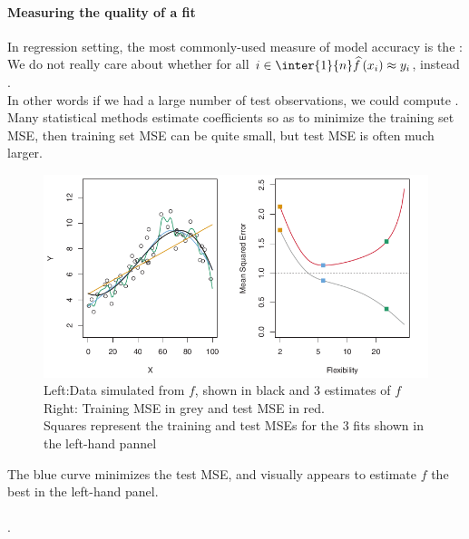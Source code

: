 \paragraph{Measuring the quality of a fit}
In regression setting, the most commonly-used measure of model accuracy
is the :
\\We do not really care about whether for all $i\in\inter{1}{n}
\widehat{f}\left( x_{i} \right)\approx y_{i}$, instead .\\In other words if we
had a large number of test observations, we could compute 
.\\Many 
statistical methods estimate coefficients so as to minimize the 
training set MSE, then training set MSE can be quite small, but test
MSE is often much larger.
\begin{figure}[H]
  \centering
  \includegraphics[width=\textwidth]{./chap/1chap/1sec/2images/2_1trainingMSEandTestMSE.png}
  \caption{Left:Data simulated from $f$, shown in black and 3 estimates
  of $f$\\Right: Training MSE in grey and test MSE in red.\\Squares
represent the training and test MSEs for the 3 fits shown in the 
left-hand pannel}
  \label{fig:2.1}
\end{figure}
The blue curve minimizes the test MSE, and visually appears to estimate
$f$ the best in the left-hand panel.\\\\
.

